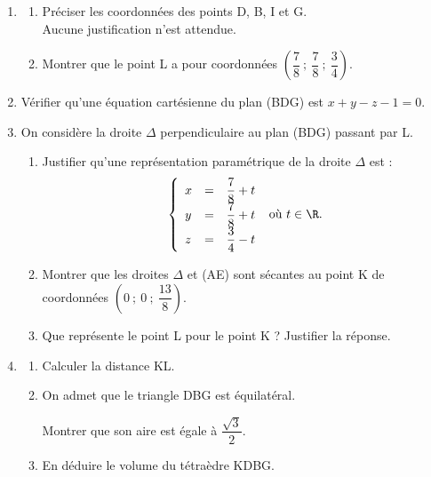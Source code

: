 \begin{enumerate}
\item
	\begin{enumerate}
		\item Préciser les coordonnées des points D, B, I et G. \\
		Aucune justification n'est attendue.
		\item Montrer que le point L a pour coordonnées $\left(\dfrac78~;~\dfrac78~;~\dfrac34\right)$.
	\end{enumerate}
\item Vérifier qu'une équation cartésienne du plan (BDG) est $x + y - z - 1 = 0$.
\item On considère la droite $\Delta$ perpendiculaire au plan (BDG) passant par L.
	\begin{enumerate}
		\item Justifier qu'une représentation paramétrique de la droite $\Delta$ est : 
\renewcommand\arraystretch{1.9}
\[
\left\{\begin{array}{l c l}x&=&\dfrac78 + t \\ y &=& \dfrac78+t \\ z&=&\dfrac34 -t \end{array}\right. \text{ où } t \in \R. \]
\renewcommand\arraystretch{1}
		\item Montrer que les droites $\Delta$ et (AE) sont sécantes au point K de coordonnées $\left(0~;~0~;~\dfrac{13}{8}\right)$.
		\item Que représente le point L pour le point K ? Justifier la réponse.
	\end{enumerate}
\item 
	\begin{enumerate}
		\item Calculer la distance KL.
		\item On admet que le triangle DBG est équilatéral. 
		
		Montrer que son aire est égale à $\dfrac{\sqrt{3}}{2}$.

		\item En déduire le volume du tétraèdre KDBG.

	\end{enumerate}
	

\end{enumerate}
